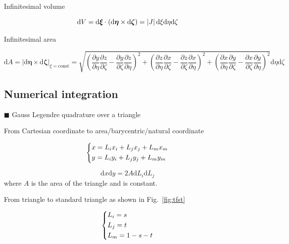 Infinitesimal volume

\begin{equation}
{\rm{d}}V = {\rm{d}} {\bm{\xi}}  \cdot \left( {{\rm{d}} {\bm{\eta}}  \times {\rm{d}} {\bm{\zeta}} } \right) = \left| J \right|{\rm{d}}\xi {\rm{d}}\eta {\rm{d}}\zeta 
\end{equation}

Infinitesimal area

\begin{equation}
{\text{d}}A = {\left| {{\text{d}} {\bm{\eta}} \times {\text{d}} {\bm{\zeta}} } \right|_{\xi  = {\text{const}}}} = \sqrt {{{\left( {\frac{{\partial y}}{{\partial \eta }}\frac{{\partial z}}{{\partial \zeta }} - \frac{{\partial y}}{{\partial \zeta }}\frac{{\partial z}}{{\partial \eta }}} \right)}^2} + {{\left( {\frac{{\partial z}}{{\partial \eta }}\frac{{\partial x}}{{\partial \zeta }} - \frac{{\partial z}}{{\partial \zeta }}\frac{{\partial x}}{{\partial \eta }}} \right)}^2} + {{\left( {\frac{{\partial x}}{{\partial \eta }}\frac{{\partial y}}{{\partial \zeta }} - \frac{{\partial x}}{{\partial \zeta }}\frac{{\partial y}}{{\partial \eta }}} \right)}^2}} {\text{d}}\eta {\text{d}}\zeta 
\end{equation}

\subsection{Numerical integration}

$\blacksquare$ Gauss Legendre quadrature over a triangle \cite{RathodHT2004}

From Cartesian coordinate to area/barycentric/natural coordinate

\begin{equation}
\left\{ \begin{gathered}
  x = {L_i}{x_i} + {L_j}{x_j} + {L_m}{x_m} \hfill \\
  y = {L_i}{y_i} + {L_j}{y_j} + {L_m}{y_m} \hfill \\ 
\end{gathered}  \right.
\end{equation}

\begin{equation}
{\text{d}}{x}{\text{d}}{y} = 2A{\text{d}}{L_i}{\text{d}}{L_j}
\end{equation}
where $A$ is the area of the triangle and is constant.

From triangle to standard triangle as shown in Fig.~\ref{fig:tfst}

\begin{equation}
\left\{ \begin{gathered}
  {L_i} = s \hfill \\
  {L_j} = t \hfill \\
  {L_m} = 1 - s - t \hfill \\ 
\end{gathered}  \right.
\end{equation}

